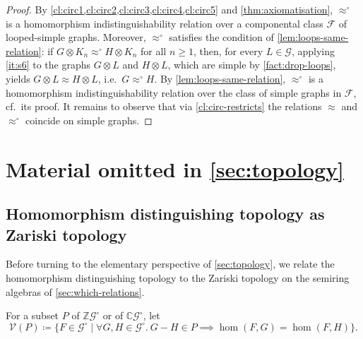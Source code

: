 \documentclass[11pt]{scrartcl}
\theoremstyle{definition}
\theoremstyle{plain}
\theoremstyle{remark}
\newcommand{\lG}{\mathcal{G}^\circ}
\newcommand{\G}{\mathcal{G}}
\begin{document}
\begin{proof}
		By \cref{cl:circ1,cl:circ2,cl:circ3,cl:circ4,cl:circ5} and \cref{thm:axiomatisation},
		$\approx^\circ$ is a homomorphism indistinguishability relation over a componental class $\mathcal{F}$ of looped-simple graphs.
		Moreover, $\approx^\circ$ satisfies the condition of \cref{lem:loops-same-relation}:
		if $G \otimes K_n \approx^\circ H \otimes K_n$ for all $n \geq 1$,
		then, for every $L \in \G$, applying \cref{it:s6} to the graphs $G \otimes L$ and $H \otimes L$, which are simple by \cref{fact:drop-loops},
		yields $G \otimes L \approx H \otimes L$, i.e.\ $G \approx^\circ H$.
		By \cref{lem:loops-same-relation},
		$\approx^\circ$ is a homomorphism indistinguishability relation over the class of simple graphs in $\mathcal{F}$, cf.\ its proof.
		It remains to observe that via \cref{cl:circ-restricts} the relations $\approx$ and $\approx^\circ$ coincide on simple graphs.
	\end{proof}


    \section{Material omitted in \texorpdfstring{\cref{sec:topology}}{Topology}}

    \subsection{Homomorphism distinguishing topology as Zariski topology}

    Before turning to the elementary perspective of \cref{sec:topology},
    we relate the homomorphism distinguishing topology to the Zariski topology on the semiring algebras of \cref{sec:which-relations}.

    For a subset $P$ of $\mathbb{Z}\lG$ or of $\mathbb{C}\lG$, let
    \[
        \mathcal{V}(P) \coloneqq \{F \in \lG \mid \forall G, H \in \lG.\ G - H \in P \implies \hom(F,G) = \hom(F,H)\}.
    \]
    
\end{document}
